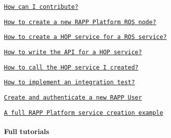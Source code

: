 \begin{DoxyItemize}
\item \href{https://github.com/rapp-project/rapp-platform/wiki/How-can-I-contribute%3F}{\tt How can I contribute?}
\item \href{https://github.com/rapp-project/rapp-platform/wiki/How-to-create-a-new-RAPP-Platform-ROS-node%3F}{\tt How to create a new R\-A\-P\-P Platform R\-O\-S node?}
\item \href{https://github.com/rapp-project/rapp-platform/wiki/How-to-create-a-HOP-service-for-a-ROS-service%3F}{\tt How to create a H\-O\-P service for a R\-O\-S service?}
\item \href{https://github.com/rapp-project/rapp-platform/wiki/How-to-write-the-API-for-a-HOP-service%3F}{\tt How to write the A\-P\-I for a H\-O\-P service?}
\item \href{https://github.com/rapp-project/rapp-platform/wiki/How-to-call-the-HOP-service-I-created%3F}{\tt How to call the H\-O\-P service I created?}
\item \href{https://github.com/rapp-project/rapp-platform/wiki/How-to-implement-an-integration-test%3F}{\tt How to implement an integration test?}
\item \href{https://github.com/rapp-project/rapp-platform/wiki/Create-a-new-RAPP-user}{\tt Create and authenticate a new R\-A\-P\-P User}
\item \href{https://github.com/rapp-project/rapp-platform/wiki/A-full-RAPP-Platform-service-creation-example}{\tt A full R\-A\-P\-P Platform service creation example}
\end{DoxyItemize}

\paragraph*{Full tutorials}



